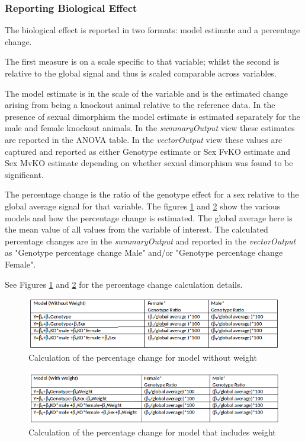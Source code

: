 \documentclass[12pt,a4paper]{article}
\begin{document}
\subsubsection{Reporting Biological Effect}
\label{section:BiologicalEffect}
The biological effect is reported in two formats: model estimate and a percentage change. 

The first measure is on a scale specific to that variable; whilst the second is relative to the global signal and thus is scaled comparable across variables. 

The model estimate is in the scale of the variable and is the estimated change arising from being a knockout animal relative to the reference data. In the presence of sexual dimorphism the model estimate is estimated separately for the male and female knockout animals. In the \textit{summaryOutput} view these estimates are reported in the ANOVA table. In the \textit{vectorOutput} view these values are captured and reported as either Genotype estimate or Sex FvKO estimate and Sex MvKO estimate depending on whether sexual dimorphism was found to be significant.

The percentage change is the ratio of the genotype effect for a sex relative to the global average signal for that variable. The figures \ref{fig:05_be1} and \ref{fig:05_be2} show the various models and how the percentage change is estimated. The global average here is the mean value of all values from the variable of interest. The calculated percentage changes are in the \textit{summaryOutput} and reported in the \textit{vectorOutput} as "Genotype percentage change Male" and/or "Genotype percentage change Female".  

See Figures \ref{fig:05_be1} and \ref{fig:05_be2} for the percentage change calculation details.

\begin{figure}[!htpb]%
\centerline{\includegraphics[scale=0.6]{BiologicalEffect4.png}}
\caption{Calculation of the percentage change for model without weight}\label{fig:05_be1}
\end{figure}

\begin{figure}[!htpb]%
\centerline{\includegraphics[scale=0.6]{BiologicalEffect3.png}}
\caption{Calculation of the percentage change for model that includes weight}\label{fig:05_be2}
\end{figure}
\end{document}
